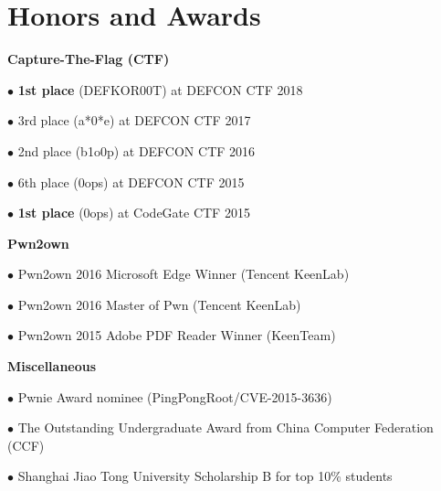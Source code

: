 \section*{Honors and Awards}
\begin{description}
\item{\bf {Capture-The-Flag (CTF)}}
	\item $\bullet$ \textbf{1st place} (DEFKOR00T) at DEFCON CTF 2018 
	\item $\bullet$ 3rd place (a*0*e) at DEFCON CTF 2017 
	\item $\bullet$ 2nd place (b1o0p) at DEFCON CTF 2016 
	\item $\bullet$ 6th place (0ops) at DEFCON CTF 2015 
	\item $\bullet$ \textbf{1st place} (0ops) at CodeGate CTF 2015 
\item{\bf {Pwn2own}}
	\item $\bullet$ Pwn2own 2016 Microsoft Edge Winner (Tencent KeenLab) 
	\item $\bullet$ Pwn2own 2016 Master of Pwn (Tencent KeenLab) 
	\item $\bullet$ Pwn2own 2015 Adobe PDF Reader Winner (KeenTeam) 
\item{\bf {Miscellaneous}}
	\item $\bullet$ Pwnie Award nominee (PingPongRoot/CVE-2015-3636) 
	\item $\bullet$ The Outstanding Undergraduate Award from China Computer Federation (CCF) 
	\item $\bullet$ Shanghai Jiao Tong University Scholarship B for top 10\% students 
\end{description}
